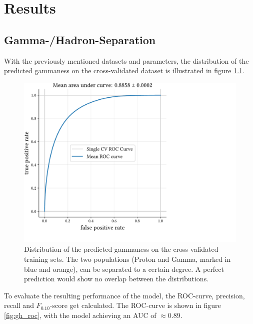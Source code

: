 \chapter{Results}\label{Results}


\section{Gamma-/Hadron-Separation}\label{Gamma-/Hadron-Separation}

With the previously mentioned datasets and parameters, the distribution of the predicted gammaness
on the cross-validated dataset is illustrated in figure \ref{fig:gh_sep}.

\begin{figure}
    \centering
    \captionsetup{width=0.9\linewidth}
    \includegraphics[page=2, width=.9\textwidth]{../analysis/plots/cross_val_sep_perf_plot.pdf}
    \caption{Distribution of the predicted gammaness on the cross-validated training sets.
	    The two populations (Proton and Gamma, marked in blue and orange), can be separated 
	    to a certain degree.
        A perfect prediction would show no overlap between the distributions.}
    \label{fig:gh_sep}
\end{figure}

To evaluate the resulting performance of the model, the ROC-curve, precision, recall and
$F_{\num{0.10}}$-score get calculated. 
The ROC-curve is shown in figure \ref{fig:gh_roc}, with the model achieving an AUC of 
$\approx \num{0.89}$.

